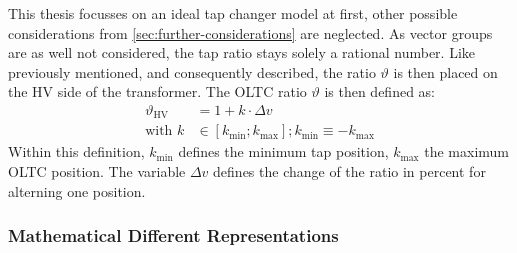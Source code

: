 This thesis focusses on an ideal tap changer model at first, other possible considerations from \autoref{sec:further-considerations} are neglected.
As vector groups are as well not considered, the tap ratio stays solely a rational number.
Like previously mentioned, and consequently described, the ratio $\vartheta$ is then placed on the \acs{HV} side of the transformer.
The \acs{OLTC} ratio $\vartheta$ is then defined as:
\begin{align}
        \vartheta_\mathrm{HV} &= 1 + k \cdot \Delta v \label{eq:tap-ratio-hv} \\[6pt]
        \text{with } k &\in [k_\mathrm{min};k_\mathrm{max}]; k_\mathrm{min} \equiv  -k_\mathrm{max} \label{eq:tap-pos}
\end{align}
Within this definition, $k_\mathrm{min}$ defines the minimum tap position, $k_\mathrm{max}$ the maximum \acs{OLTC} position. 
The variable $\Delta v$ defines the change of the ratio in percent for alterning one position.


\subsubsection{Mathematical Different Representations}


